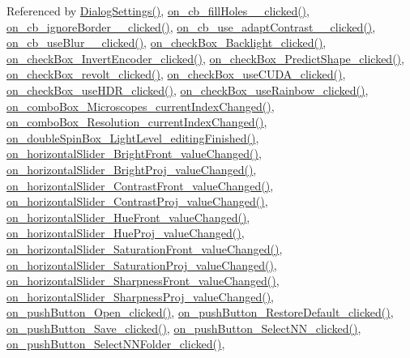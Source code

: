 Referenced by \hyperlink{dialogsettings_8cpp_source_l00005}{Dialog\+Settings()}, \hyperlink{dialogsettings_8cpp_source_l00393}{on\+\_\+cb\+\_\+fill\+Holes\+\_\+\_\+clicked()}, \hyperlink{dialogsettings_8cpp_source_l00389}{on\+\_\+cb\+\_\+ignore\+Border\+\_\+\_\+clicked()}, \hyperlink{dialogsettings_8cpp_source_l00370}{on\+\_\+cb\+\_\+use\+\_\+adapt\+Contrast\+\_\+\_\+clicked()}, \hyperlink{dialogsettings_8cpp_source_l00376}{on\+\_\+cb\+\_\+use\+Blur\+\_\+\_\+clicked()}, \hyperlink{dialogsettings_8cpp_source_l00222}{on\+\_\+check\+Box\+\_\+\+Backlight\+\_\+clicked()}, \hyperlink{dialogsettings_8cpp_source_l00299}{on\+\_\+check\+Box\+\_\+\+Invert\+Encoder\+\_\+clicked()}, \hyperlink{dialogsettings_8cpp_source_l00515}{on\+\_\+check\+Box\+\_\+\+Predict\+Shape\+\_\+clicked()}, \hyperlink{dialogsettings_8cpp_source_l00519}{on\+\_\+check\+Box\+\_\+revolt\+\_\+clicked()}, \hyperlink{dialogsettings_8cpp_source_l00303}{on\+\_\+check\+Box\+\_\+use\+C\+U\+D\+A\+\_\+clicked()}, \hyperlink{dialogsettings_8cpp_source_l00256}{on\+\_\+check\+Box\+\_\+use\+H\+D\+R\+\_\+clicked()}, \hyperlink{dialogsettings_8cpp_source_l00295}{on\+\_\+check\+Box\+\_\+use\+Rainbow\+\_\+clicked()}, \hyperlink{dialogsettings_8cpp_source_l00227}{on\+\_\+combo\+Box\+\_\+\+Microscopes\+\_\+current\+Index\+Changed()}, \hyperlink{dialogsettings_8cpp_source_l00247}{on\+\_\+combo\+Box\+\_\+\+Resolution\+\_\+current\+Index\+Changed()}, \hyperlink{dialogsettings_8cpp_source_l00290}{on\+\_\+double\+Spin\+Box\+\_\+\+Light\+Level\+\_\+editing\+Finished()}, \hyperlink{dialogsettings_8cpp_source_l00307}{on\+\_\+horizontal\+Slider\+\_\+\+Bright\+Front\+\_\+value\+Changed()}, \hyperlink{dialogsettings_8cpp_source_l00339}{on\+\_\+horizontal\+Slider\+\_\+\+Bright\+Proj\+\_\+value\+Changed()}, \hyperlink{dialogsettings_8cpp_source_l00313}{on\+\_\+horizontal\+Slider\+\_\+\+Contrast\+Front\+\_\+value\+Changed()}, \hyperlink{dialogsettings_8cpp_source_l00345}{on\+\_\+horizontal\+Slider\+\_\+\+Contrast\+Proj\+\_\+value\+Changed()}, \hyperlink{dialogsettings_8cpp_source_l00326}{on\+\_\+horizontal\+Slider\+\_\+\+Hue\+Front\+\_\+value\+Changed()}, \hyperlink{dialogsettings_8cpp_source_l00358}{on\+\_\+horizontal\+Slider\+\_\+\+Hue\+Proj\+\_\+value\+Changed()}, \hyperlink{dialogsettings_8cpp_source_l00319}{on\+\_\+horizontal\+Slider\+\_\+\+Saturation\+Front\+\_\+value\+Changed()}, \hyperlink{dialogsettings_8cpp_source_l00351}{on\+\_\+horizontal\+Slider\+\_\+\+Saturation\+Proj\+\_\+value\+Changed()}, \hyperlink{dialogsettings_8cpp_source_l00332}{on\+\_\+horizontal\+Slider\+\_\+\+Sharpness\+Front\+\_\+value\+Changed()}, \hyperlink{dialogsettings_8cpp_source_l00364}{on\+\_\+horizontal\+Slider\+\_\+\+Sharpness\+Proj\+\_\+value\+Changed()}, \hyperlink{dialogsettings_8cpp_source_l00200}{on\+\_\+push\+Button\+\_\+\+Open\+\_\+clicked()}, \hyperlink{dialogsettings_8cpp_source_l00196}{on\+\_\+push\+Button\+\_\+\+Restore\+Default\+\_\+clicked()}, \hyperlink{dialogsettings_8cpp_source_l00211}{on\+\_\+push\+Button\+\_\+\+Save\+\_\+clicked()}, \hyperlink{dialogsettings_8cpp_source_l00498}{on\+\_\+push\+Button\+\_\+\+Select\+N\+N\+\_\+clicked()}, \hyperlink{dialogsettings_8cpp_source_l00487}{on\+\_\+push\+Button\+\_\+\+Select\+N\+N\+Folder\+\_\+clicked()}, 